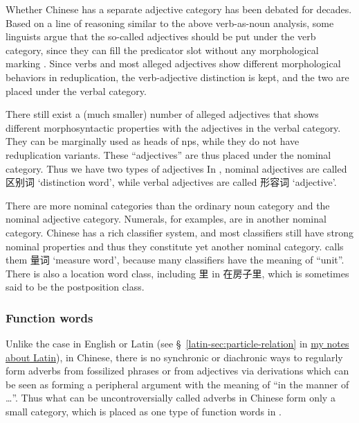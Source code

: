 \documentclass[UTF8, a4paper, oneside, scheme=plain]{ctexart}
\newcommand*{\citesec}[1]{\S~{#1}}
\newcommand{\latin}{\href{../Latin/latin-notes.pdf}{my notes about Latin}}
\newcommand{\translate}[1]{`#1'}
\begin{document}
Whether Chinese has a separate adjective category 
has been debated for decades.
Based on a line of reasoning similar to the above verb-as-noun analysis,
some linguists argue that the so-called adjectives should be put under the verb category,
since they can fill the predicator slot without any morphological marking \citep{li1989mandarin}.
Since verbs and most alleged adjectives show different morphological behaviors in reduplication, %
the verb-adjective distinction is kept,
and the two are placed under the verbal category.

There still exist a (much smaller) number of alleged adjectives that shows 
different morphosyntactic properties with the adjectives in the verbal category.
They can be marginally used as heads of \ac{np}s,
while they do not have reduplication variants.
These ``adjectives'' are thus placed under the nominal category.
Thus we have two types of adjectives
In \citet{zhudexigrammar}, 
nominal adjectives are called 区别词 \translate{distinction word},
while verbal adjectives are called 形容词 \translate{adjective}.

There are more nominal categories than the ordinary noun category and the nominal adjective category.
Numerals, for examples, are in another nominal category.
Chinese has a rich classifier system,
and most classifiers still have strong nominal properties
and thus they constitute yet another nominal category.
\citet{zhudexigrammar} calls them 量词 \translate{measure word},
because many classifiers have the meaning of ``unit''.
There is also a location word class, including 里 in 在房子里,
which is sometimes said to be the postposition class.

\subsubsection{Function words}\label{sec:function-word-introduction}

Unlike the case in English or Latin 
(see \citesec{\ref{latin-sec:particle-relation}} in \latin), 
in Chinese, there is no synchronic or diachronic ways 
to regularly form adverbs from fossilized phrases 
or from adjectives via derivations 
which can be seen as forming a peripheral argument 
with the meaning of ``in the manner of \dots''.
Thus what can be uncontroversially called adverbs in Chinese 
form only a small category,
which is placed as one type of function words in \citet{zhudexigrammar}.
\end{document}
